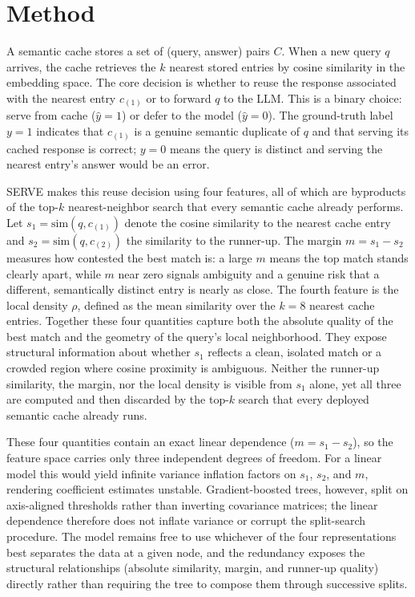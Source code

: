 \section{Method}

A semantic cache stores a set of (query, answer) pairs $C$. When a new query $q$ arrives, the cache retrieves the $k$ nearest stored entries by cosine similarity in the embedding space. The core decision is whether to reuse the response associated with the nearest entry $c_{(1)}$ or to forward $q$ to the LLM. This is a binary choice: serve from cache ($\hat{y}=1$) or defer to the model ($\hat{y}=0$). The ground-truth label $y=1$ indicates that $c_{(1)}$ is a genuine semantic duplicate of $q$ and that serving its cached response is correct; $y=0$ means the query is distinct and serving the nearest entry's answer would be an error.

SERVE makes this reuse decision using four features, all of which are byproducts of the top-$k$ nearest-neighbor search that every semantic cache already performs. Let $s_1 = \mathrm{sim}(q, c_{(1)})$ denote the cosine similarity to the nearest cache entry and $s_2 = \mathrm{sim}(q, c_{(2)})$ the similarity to the runner-up. The margin $m = s_1 - s_2$ measures how contested the best match is: a large $m$ means the top match stands clearly apart, while $m$ near zero signals ambiguity and a genuine risk that a different, semantically distinct entry is nearly as close. The fourth feature is the local density $\rho$, defined as the mean similarity over the $k=8$ nearest cache entries.
Together these four quantities capture both the absolute quality of the best match and the geometry of the query's local neighborhood. They expose structural information about whether $s_1$ reflects a clean, isolated match or a crowded region where cosine proximity is ambiguous. Neither the runner-up similarity, the margin, nor the local density is visible from $s_1$ alone, yet all three are computed and then discarded by the top-$k$ search that every deployed semantic cache already runs.

These four quantities contain an exact linear dependence ($m = s_1 - s_2$), so the feature space carries only three independent degrees of freedom. For a linear model this would yield infinite variance inflation factors on $s_1$, $s_2$, and $m$, rendering coefficient estimates unstable. Gradient-boosted trees, however, split on axis-aligned thresholds rather than inverting covariance matrices; the linear dependence therefore does not inflate variance or corrupt the split-search procedure. The model remains free to use whichever of the four representations best separates the data at a given node, and the redundancy exposes the structural relationships (absolute similarity, margin, and runner-up quality) directly rather than requiring the tree to compose them through successive splits.

